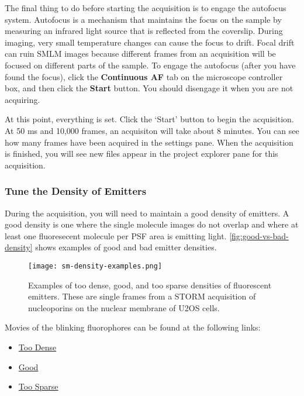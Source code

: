 \documentclass[10pt,a4paper,oneside]{book}
\begin{document}
The final thing to do before starting the acquisition is to engage the autofocus system. Autofocus is a mechanism that maintains the focus on the sample by measuring an infrared light source that is reflected from the coverslip. During imaging, very small temperature changes can cause the focus to drift. Focal drift can ruin SMLM images because different frames from an acquisition will be focused on different parts of the sample. To engage the autofocus (after you have found the focus), click the \textbf{Continuous AF} tab on the microscope controller box, and then click the \textbf{Start} button. You should disengage it when you are not acquiring.

At this point, everything is set. Click the `Start' button to begin the acquisition. At 50 ms and 10,000 frames, an acquisiton will take about 8 minutes. You can see how many frames have been acquired in the settings pane. When the acquisition is finished, you will see new files appear in the project explorer pane for this acquisition.

\subsubsection{Tune the Density of Emitters}

During the acquisition, you will need to maintain a good density of emitters. A good density is one where the single molecule images do not overlap and where at least one fluoresecent molecule per PSF area is emitting light. \autoref{fig:good-vs-bad-density} shows examples of good and bad emitter densities.

\begin{figure}[ht]
    \centering
    \texttt{[image: sm-density-examples.png]}
    \caption{Examples of too dense, good, and too sparse densities of fluorescent emitters. These are single frames from a STORM acquisition of nucleoporins on the nuclear membrane of U2OS cells.}
    \label{fig:good-vs-bad-density}
\end{figure}

Movies of the blinking fluorophores can be found at the following links:

\begin{itemize}
    \item \href{https://drive.google.com/file/d/12zIK-BqMl0qttkYljKi7P9xZ3krMvthe/view?usp=sharing}{Too Dense}
    \item \href{https://drive.google.com/file/d/1Is4U-K297sku4u20OJqwY6IOUags1bLl/view?usp=sharing}{Good}
    \item \href{https://drive.google.com/file/d/1W2AxVjYirPj8t8d2__m8rNoNTUyM3RfY/view?usp=sharing}{Too Sparse}
\end{itemize}
\end{document}
